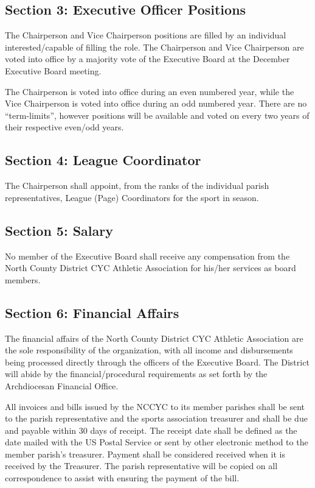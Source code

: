 \documentclass[draft]{memoir}
\begin{document}
\subsection{Section 3: Executive Officer Positions}
The Chairperson and Vice Chairperson positions are filled by an individual interested/capable of filling the role. The Chairperson and Vice Chairperson are voted into office by a majority vote of the Executive Board at the December Executive Board meeting.

The Chairperson is voted into office during an even numbered year, while the Vice Chairperson is voted into office during an odd numbered year. There are no “term-limits”, however positions will be available and voted on every two years of their respective even/odd years.

\subsection{Section 4: League Coordinator}
The Chairperson shall appoint, from the ranks of the individual parish representatives, League (Page) Coordinators for the sport in season.

\subsection{Section 5: Salary}
No member of the Executive Board shall receive any compensation from the North County District CYC Athletic Association for his/her services as board members.

\subsection{Section 6: Financial Affairs}
The financial affairs of the North County District CYC Athletic Association are the sole responsibility of the organization, with all income and disbursements being processed directly through the officers of the Executive Board.  The District will abide by the financial/procedural requirements as set forth by the Archdiocesan Financial Office.

All invoices and bills issued by the NCCYC to its member parishes shall be sent to the parish representative and the sports association treasurer and shall be due and payable within 30 days of receipt.  The receipt date shall be defined as the date mailed with the US Postal Service or sent by other electronic method to the member parish’s treasurer.  Payment shall be considered received when it is received by the Treasurer.  The parish representative will be copied on all correspondence to assist with ensuring the payment of the bill.
\end{document}
